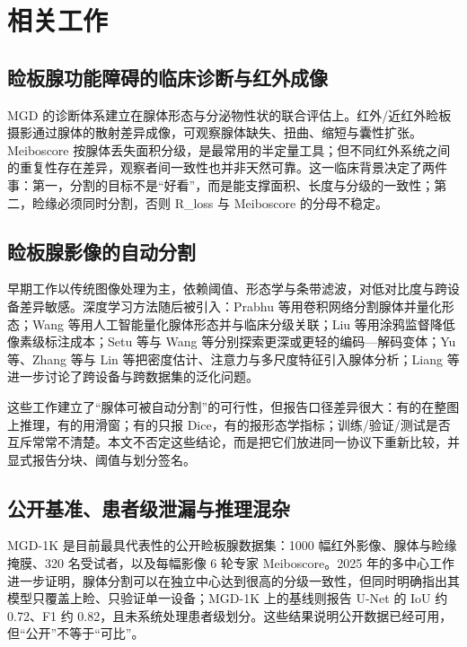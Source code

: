 \section{相关工作}\label{sec:related}

\subsection{睑板腺功能障碍的临床诊断与红外成像}

MGD 的诊断体系建立在腺体形态与分泌物性状的联合评估上\cite{foulks2003,villani2020latest}。红外/近红外睑板摄影通过腺体的散射差异成像，可观察腺体缺失、扭曲、缩短与囊性扩张\cite{wise2012meibography}。Meiboscore 按腺体丢失面积分级，是最常用的半定量工具；但不同红外系统之间的重复性存在差异，观察者间一致性也并非天然可靠\cite{ngo2014repeat}。这一临床背景决定了两件事：第一，分割的目标不是“好看”，而是能支撑面积、长度与分级的一致性；第二，睑缘必须同时分割，否则 R\_loss 与 Meiboscore 的分母不稳定。

\subsection{睑板腺影像的自动分割}

早期工作以传统图像处理为主，依赖阈值、形态学与条带滤波，对低对比度与跨设备差异敏感。深度学习方法随后被引入：Prabhu 等用卷积网络分割腺体并量化形态\cite{prabhu2020segmentation}；Wang 等用人工智能量化腺体形态并与临床分级关联\cite{wang2021morphology}；Liu 等用涂鸦监督降低像素级标注成本\cite{liu2022scribble}；Setu 等与 Wang 等分别探索更深或更轻的编码—解码变体\cite{setu2021deep,wang2019deep}；Yu 等、Zhang 等与 Lin 等把密度估计、注意力与多尺度特征引入腺体分析\cite{yu2022automatic,zhang2022density,lin2021automatic}；Liang 等进一步讨论了跨设备与跨数据集的泛化问题\cite{liang2024exploring}。

这些工作建立了“腺体可被自动分割”的可行性，但报告口径差异很大：有的在整图上推理，有的用滑窗；有的只报 Dice，有的报形态学指标；训练/验证/测试是否互斥常常不清楚。本文不否定这些结论，而是把它们放进同一协议下重新比较，并显式报告分块、阈值与划分签名。

\subsection{公开基准、患者级泄漏与推理混杂}

MGD-1K 是目前最具代表性的公开睑板腺数据集：1000 幅红外影像、腺体与睑缘掩膜、320 名受试者，以及每幅影像 6 轮专家 Meiboscore\cite{saha2022automated}。2025 年的多中心工作进一步证明，腺体分割可以在独立中心达到很高的分级一致性，但同时明确指出其模型只覆盖上睑、只验证单一设备\cite{li2025multicenter}；MGD-1K 上的基线则报告 U-Net 的 IoU 约 0.72、F1 约 0.82，且未系统处理患者级划分\cite{yu2025quantitative}。这些结果说明公开数据已经可用，但“公开”不等于“可比”。

